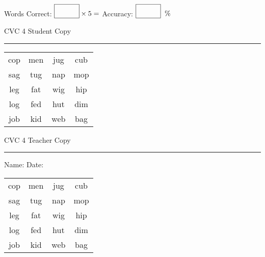 \documentclass{memoir}
\begin{document}
\normalsize

Words Correct: $\fbox{\phantom{\huge 100}} \times 5 = $ Accuracy: $\fbox{\phantom{\huge 100}}\;\; \%$ 

\vfill

\newpage


\footnotesize \noindent
CVC 4 \hfill Student Copy
\smallskip
\hrule

\huge

\setlength{\tabcolsep}{14pt}
\def\arraystretch{2}

{\selectfont


\begin{vplace}[0.5]
\begin{center}
\begin{tabular}{cccc}
cop & men & jug & cub \\
sag & tug & nap & mop \\
leg & fat & wig & hip \\
log & fed & hut & dim \\
job & kid & web & bag \\
\end{tabular}
\end{center}
\end{vplace}

}

\newpage

\footnotesize \noindent
CVC 4 \hfill Teacher Copy
\smallskip
\hrule

\normalsize

\vfill

\noindent
Name: \underline{\hspace{1.75in}} \hfill Date: \underline{\hspace{1in}}

\huge

{\selectfont


\begin{vplace}[0.5]
\begin{center}
\begin{tabular}{cccc}
cop & men & jug & cub \\
sag & tug & nap & mop \\
leg & fat & wig & hip \\
log & fed & hut & dim \\
job & kid & web & bag \\
\end{tabular}
\end{center}
\end{vplace}



}
\end{document}
